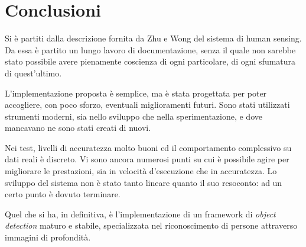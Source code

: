 
\chapter{Conclusioni} %
\label{cha:conclusioni}
	Si è partiti dalla descrizione fornita da Zhu e Wong del sistema di human sensing.
	Da essa è partito un lungo lavoro di documentazione, senza il quale non sarebbe stato possibile avere pienamente coscienza di ogni particolare, di ogni sfumatura di quest'ultimo.

	L'implementazione proposta è semplice, ma è stata progettata per poter accogliere, con poco sforzo, eventuali miglioramenti futuri.
	Sono stati utilizzati strumenti moderni, sia nello sviluppo che nella sperimentazione, e dove mancavano ne sono stati creati di nuovi.

	Nei test, livelli di accuratezza molto buoni ed il comportamento complessivo su dati reali è discreto.
	Vi sono ancora numerosi punti su cui è possibile agire per migliorare le prestazioni, sia in velocità d'esecuzione che in accuratezza.
	Lo sviluppo del sistema non è stato tanto lineare quanto il suo resoconto: ad un certo punto è dovuto terminare.

	Quel che si ha, in definitiva, è l'implementazione di un framework di \emph{object detection} maturo e stabile, specializzata nel riconoscimento di persone attraverso immagini di profondità.

